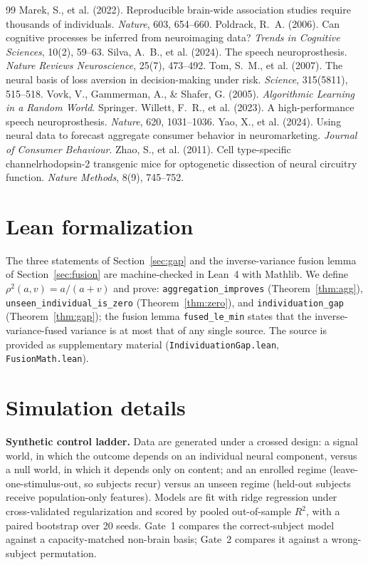 \documentclass{article}
\begin{document}
\begin{thebibliography}{99}
 Marek, S., et al. (2022). Reproducible brain-wide association studies require thousands of individuals. \emph{Nature}, 603, 654--660.
 Poldrack, R.~A. (2006). Can cognitive processes be inferred from neuroimaging data? \emph{Trends in Cognitive Sciences}, 10(2), 59--63.
 Silva, A.~B., et al. (2024). The speech neuroprosthesis. \emph{Nature Reviews Neuroscience}, 25(7), 473--492.
 Tom, S.~M., et al. (2007). The neural basis of loss aversion in decision-making under risk. \emph{Science}, 315(5811), 515--518.
 Vovk, V., Gammerman, A., \& Shafer, G. (2005). \emph{Algorithmic Learning in a Random World}. Springer.
 Willett, F.~R., et al. (2023). A high-performance speech neuroprosthesis. \emph{Nature}, 620, 1031--1036.
 Yao, X., et al. (2024). Using neural data to forecast aggregate consumer behavior in neuromarketing. \emph{Journal of Consumer Behaviour}.
 Zhao, S., et al. (2011). Cell type-specific channelrhodopsin-2 transgenic mice for optogenetic dissection of neural circuitry function. \emph{Nature Methods}, 8(9), 745--752.
\end{thebibliography}

\appendix
\section{Lean formalization}
\label{app:lean}
The three statements of Section~\ref{sec:gap} and the inverse-variance fusion lemma of
Section~\ref{sec:fusion} are machine-checked in Lean~4 with Mathlib. We define
$\rho^2(a,v)=a/(a+v)$ and prove: \texttt{aggregation\_improves} (Theorem~\ref{thm:agg}),
\texttt{unseen\_individual\_is\_zero} (Theorem~\ref{thm:zero}), and \texttt{individuation\_gap}
(Theorem~\ref{thm:gap}); the fusion lemma \texttt{fused\_le\_min} states that the inverse-variance-fused
variance is at most that of any single source. The source is provided as supplementary material
(\texttt{IndividuationGap.lean}, \texttt{FusionMath.lean}).

\section{Simulation details}
\label{app:sim}
\textbf{Synthetic control ladder.} Data are generated under a crossed design: a signal world, in which the
outcome depends on an individual neural component, versus a null world, in which it depends only on content;
and an enrolled regime (leave-one-stimulus-out, so subjects recur) versus an unseen regime (held-out
subjects receive population-only features). Models are fit with ridge regression under cross-validated
regularization and scored by pooled out-of-sample $R^2$, with a paired bootstrap over 20 seeds. Gate~1
compares the correct-subject model against a capacity-matched non-brain basis; Gate~2 compares it against a
wrong-subject permutation.
\end{document}
